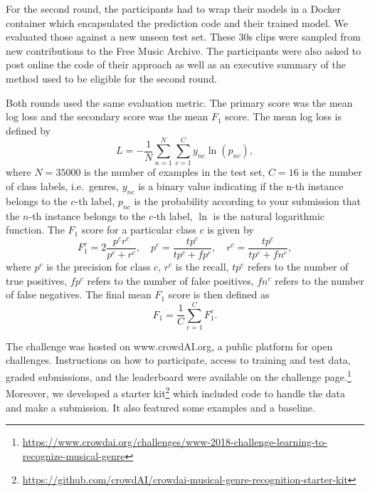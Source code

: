 \documentclass[sigconf]{acmart}
\begin{document}
For the second round, the participants had to wrap their models in a Docker container which encapsulated the prediction code and their trained model.
We evaluated those against a new unseen test set. These 30s clips were sampled from new contributions to the Free Music Archive.
The participants were also asked to post online the code of their approach as well as an executive summary of the method used to be eligible for the second round.

Both rounds used the same evaluation metric. The primary score was the mean log loss and the secondary score was the mean $F_1$ score.
The mean log loss is defined by
\begin{equation}
	L = - \frac{1}{N} \sum_{n=1}^N \sum_{c=1}^{C} y_{nc} \ln(p_{nc}),
\end{equation}
where $N=35000$ is the number of examples in the test set,
$C=16$ is the number of class labels, i.e.\ genres,
$y_{nc}$ is a binary value indicating if the n-th instance belongs to the $c$-th label,
$p_{nc}$ is the probability according to your submission that the $n$-th instance belongs to the $c$-th label,
$\ln$ is the natural logarithmic function.
The $F_1$ score for a particular class $c$ is given by
\begin{equation}
	F_1^c = 2\frac{p^c r^c}{p^c + r^c}, \hspace{1em}
	p^c = \frac{tp^c}{tp^c + fp^c}, \hspace{1em}
	r^c = \frac{tp^c}{tp^c + fn^c},
\end{equation}
where
$p^c$ is the precision for class $c$,
$r^c$ is the recall,
$tp^c$ refers to the number of true positives,
$fp^c$ refers to the number of false positives,
$fn^c$ refers to the number of false negatives.
The final mean $F_1$ score is then defined as
\begin{equation}
	F_1 = \frac{1}{C} \sum_{c=1}^{C} F_1^c.
\end{equation}

The challenge was hosted on www.crowdAI.org, a public platform for open challenges. Instructions on how to participate, access to training and test data, graded submissions, and the leaderboard were available on the challenge page.\footnote{\url{https://www.crowdai.org/challenges/www-2018-challenge-learning-to-recognize-musical-genre}}
Moreover, we developed a starter kit\footnote{\url{https://github.com/crowdAI/crowdai-musical-genre-recognition-starter-kit}} which included code to handle the data and make a submission. It also featured some examples and a baseline.
\end{document}
